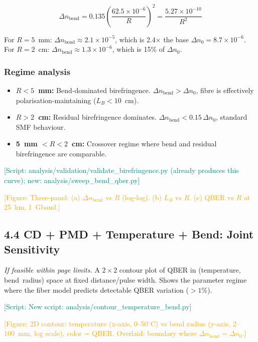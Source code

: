\documentclass[11pt,a4paper]{article}
\newcommand{\scriptref}[1]{\textcolor{teal}{[Script: #1]}}
\newcommand{\figref}[1]{\textcolor{orange}{[Figure: #1]}}
\begin{document}
\begin{equation}
  \Delta n_{\text{bend}} = 0.135 \left(\frac{62.5\times10^{-6}}{R}\right)^2
  = \frac{5.27\times10^{-10}}{R^2}
\end{equation}

For $R = 5$~mm: $\Delta n_{\text{bend}} \approx 2.1\times10^{-5}$,
which is 2.4$\times$ the base $\Delta n_0 = 8.7\times10^{-6}$.
For $R = 2$~cm: $\Delta n_{\text{bend}} \approx 1.3\times10^{-6}$,
which is 15\% of $\Delta n_0$.

\subsubsection*{Regime analysis}
\begin{itemize}[nosep]
  \item \textbf{$R < 5$~mm:} Bend-dominated birefringence.
    $\Delta n_{\text{bend}} > \Delta n_0$, fibre is effectively
    polarisation-maintaining ($L_B < 10$~cm).
  \item \textbf{$R > 2$~cm:} Residual birefringence dominates.
    $\Delta n_{\text{bend}} < 0.15\,\Delta n_0$, standard SMF behaviour.
  \item \textbf{5~mm $< R < 2$~cm:} Crossover regime where bend and
    residual birefringence are comparable.
\end{itemize}

\scriptref{analysis/validation/validate\_birefringence.py (already
  produces this curve); new: analysis/sweep\_bend\_qber.py}

\figref{Three-panel: (a) $\Delta n_{\text{bend}}$ vs $R$ (log-log).
  (b) $L_B$ vs $R$.  (c) QBER vs $R$ at 25~km, 1~Gbaud.}

\subsection{4.4 CD + PMD + Temperature + Bend: Joint Sensitivity}
\label{sec:qber-joint}

\emph{If feasible within page limits.}  A $2\times2$ contour plot of
QBER in (temperature, bend~radius) space at fixed distance/pulse width.
Shows the parameter regime where the fiber model predicts detectable
QBER variation ($>1$\%).

\scriptref{New script: analysis/contour\_temperature\_bend.py}

\figref{2D contour: temperature (x-axis, 0--50$^\circ$C) vs bend radius
  (y-axis, 2--100~mm, log scale), color = QBER.  Overlaid: boundary
  where $\Delta n_{\text{bend}} = \Delta n_0$.}
\end{document}
